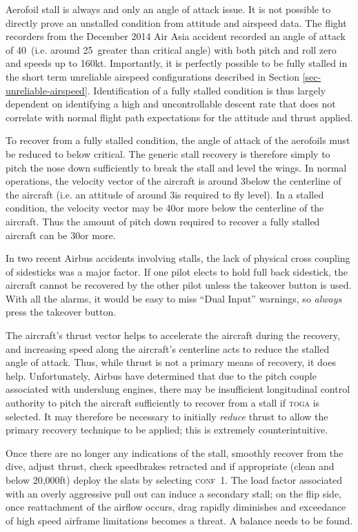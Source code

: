 \documentclass[a5paper,11pt,twoside]{book}
\newcommand{\ac}[1]{{\scshape\MakeLowercase{#1}}}
\begin{document}
Aerofoil stall is always and only an angle of attack issue. It is not possible
to directly prove an unstalled condition from attitude and airspeed data. The
flight recorders from the December 2014 Air Asia accident recorded an angle of
attack of 40\textdegree\ (i.e. around 25\textdegree\ greater than critical
angle) with both pitch and roll zero and speeds up to 160kt. Importantly, it is
perfectly possible to be fully stalled in the short term unreliable airspeed
configurations described in Section
\ref{sec-unreliable-airspeed}. Identification of a fully stalled condition is
thus largely dependent on identifying a high and uncontrollable descent rate
that does not correlate with normal flight path expectations for the attitude
and thrust applied.

To recover from a fully stalled condition, the angle of attack of the aerofoils
must be reduced to below critical. The generic stall recovery is therefore
simply to pitch the nose down sufficiently to break the stall and level the
wings. In normal operations, the velocity vector of the aircraft is around
3\textdegree{ }below the centerline of the aircraft (i.e. an attitude of around
3\textdegree{ }is required to fly level). In a stalled condition, the velocity
vector may be 40\textdegree{ }or more below the centerline of the
aircraft. Thus the amount of pitch down required to recover a fully stalled
aircraft can be 30\textdegree{ }or more.

In two recent Airbus accidents involving stalls, the lack of physical cross
coupling of sidesticks was a major factor. If one pilot elects to hold full back
sidestick, the aircraft cannot be recovered by the other pilot unless the
takeover button is used. With all the alarms, it would be easy to miss ``Dual
Input'' warnings, so \emph{always} press the takeover button.

The aircraft's thrust vector helps to accelerate the aircraft during the
recovery, and increasing speed along the aircraft's centerline acts to reduce
the stalled angle of attack. Thus, while thrust is not a primary means of
recovery, it does help. Unfortunately, Airbus have determined that due to the
pitch couple associated with underslung engines, there may be insufficient
longitudinal control authority to pitch the aircraft sufficiently to recover
from a stall if \ac{TOGA} is selected. It may therefore be necessary to
initially \emph{reduce} thrust to allow the primary recovery technique to be
applied; this is extremely counterintuitive.

Once there are no longer any indications of the stall, smoothly recover from the
dive, adjust thrust, check speedbrakes retracted and if appropriate (clean and
below 20,000ft) deploy the slats by selecting \ac{CONF}~1. The load factor
associated with an overly aggressive pull out can induce a secondary stall; on
the flip side, once reattachment of the airflow occurs, drag rapidly diminishes
and exceedance of high speed airframe limitations becomes a threat. A balance
needs to be found.
\end{document}
